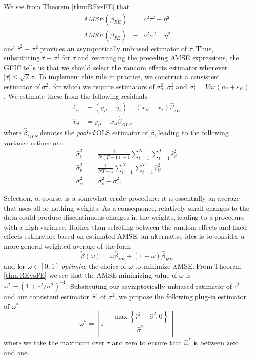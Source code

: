 We see from Theorem \ref{thm:REvsFE} that 
\begin{eqnarray}
  AMSE(\widehat{\beta}_{RE}) &=& c^2 \tau^2 + \eta^2 \\
  \label{eq:REAMSE}
  AMSE(\widehat{\beta}_{FE}) &=& c^2\sigma^2 + \eta^2  
  \label{eq:FEAMSE}
\end{eqnarray}
and $\widehat{\tau}^2 - \sigma^2$ provides an asymptotically unbiased estimator of $\tau$.
Thus, substituting $\widehat{\tau} - \sigma^2$ for $\tau$ and rearranging the preceding AMSE expressions, the GFIC tells us that we should select the random effects estimator whenever $|\widehat{\tau}|\leq \sqrt{2} \sigma$.
To implement this rule in practice, we construct a consistent estimator of $\sigma^2$, for which we require estimators of $\sigma_{\alpha}^2, \sigma_{\varepsilon}^2$ and $\sigma_{v}^2 = Var(\alpha_i + \varepsilon_{it})$.
We estimate these from the following residuals
\begin{align*}
\widehat{\epsilon}_{it}& = (y_{it} -\bar{y}_i) - (x_{it} - \bar{x}_i) \widehat{\beta}_{FE}\\
\widehat{v}_{it} &= y_{it} - x_{it} \widehat{\beta}_{OLS}
\end{align*} 
where $\widehat{\beta}_{OLS}$ denotes the \emph{pooled} OLS estimator of $\beta$, leading to the following variance estimators: 
\begin{align*}
\widehat{\sigma}_\epsilon^2 &= \frac{1}{N(T-1)-1} \sum_{i=1}^N \sum_{t=1}^T \widehat{\epsilon}_{it}^2\\
\widehat{\sigma}_v^2 &= \frac{1}{NT-1} \sum_{i=1}^N \sum_{t=1}^T \widehat{v}_{it}^2\\
\widehat{\sigma}_\alpha^2 &= \widehat{\sigma}_v^2 - \widehat{\sigma}_\epsilon^2.
\end{align*}

Selection, of course, is a somewhat crude procedure: it is essentially an average that uses all-or-nothing weights.
As a consequence, relatively small changes to the data could produce discontinuous changes in the weights, leading to a procedure with a high variance.
Rather than selecting between the random effects and fixed effects estimators based on estimated AMSE, an alternative idea is to consider a more general weighted average of the form
\[\widetilde{\beta}(\omega) =  \omega \widehat{\beta}_{FE} + (1 - \omega)\widehat{\beta}_{RE}\]
and for $\omega \in [0,1]$ \emph{optimize} the choice of $\omega$ to minimize AMSE. 
From Theorem \ref{thm:REvsFE} we see that the AMSE-minimizing value of $\omega$ is $\omega^* = (1 + \tau^2/\sigma^2)^{-1}$.
Substituting our asymptotically unbiased estimator of $\tau^2$ and our consistent estimator $\widehat{\sigma}^2$ of $\sigma^2$, we propose the following plug-in estimator of $\omega^*$ 
\begin{equation*}
  \omega^* = \left[ 1 + \frac{ \max\left\{  \widehat{\tau}^2 - \widehat{\sigma}^2, 0\right\}}{\widehat{\sigma}^2} \right]
\end{equation*}
where we take the maximum over $\widehat{\tau}$ and zero to ensure that $\widehat{\omega}^*$ is between zero and one. 

